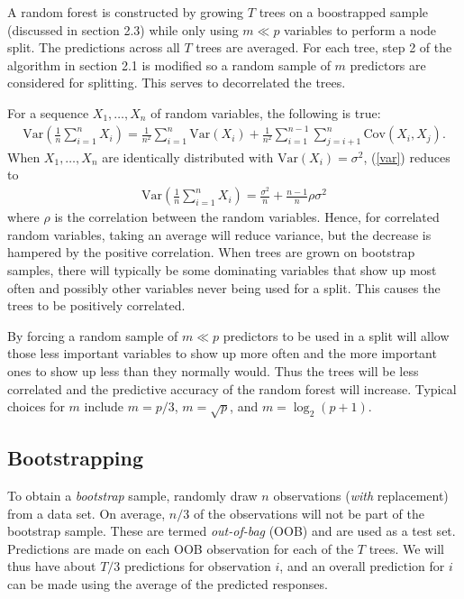 A random forest is constructed by growing $T$ trees on a boostrapped sample (discussed in section 2.3) while only using $m\ll p$ variables to perform a node split. The predictions across all $T$ trees are averaged. For each tree, step 2 of the algorithm in section 2.1 is modified so a random sample of $m$ predictors are considered for splitting. This serves to decorrelated the trees.

For a sequence $X_1,\ldots,X_n$ of random variables, the following is true:
\begin{eqnarray}
\mathrm{Var}\left(\frac{1}{n}\sum_{i=1}^nX_i\right) = \frac{1}{n^2}\sum_{i=1}^n\mathrm{Var}(X_i) + \frac{1}{n^2}\sum_{i=1}^{n-1}\sum_{j=i+1}^n\mathrm{Cov}(X_i,X_j).
\label{var}
\end{eqnarray}
When $X_1,\ldots,X_n$ are identically distributed with $\mathrm{Var}(X_i)=\sigma^2$, (\ref{var}) reduces to
\begin{eqnarray}
\mathrm{Var}\left(\frac{1}{n}\sum_{i=1}^nX_i\right) = \frac{\sigma^2}{n} + \frac{n-1}{n}\rho\sigma^2
\end{eqnarray}
where $\rho$ is the correlation between the random variables. Hence, for correlated random variables, taking an average will reduce variance, but the decrease is hampered by the positive correlation. When trees are grown on bootstrap samples, there will typically be some dominating variables that show up most often and possibly other variables never being used for a split. This causes the trees to be positively correlated.

By forcing a random sample of $m\ll p$ predictors to be used in a split will allow those less important variables to show up more often and the more important ones to show up less than they normally would. Thus the trees will be less correlated and the predictive accuracy of the random forest will increase. Typical choices for $m$ include $m=p/3$, $m=\sqrt{p}$, and $m=\log_2(p + 1)$.

\subsection{Bootstrapping}

To obtain a \emph{bootstrap} sample, randomly draw $n$ observations (\emph{with} replacement) from a data set. On average, $n/3$ of the observations will not be part of the bootstrap sample. These are termed \emph{out-of-bag} (OOB) and are used as a test set. Predictions are made on each OOB observation for each of the $T$ trees. We will thus have about $T/3$ predictions for observation $i$, and an overall prediction for $i$ can be made using the average of the predicted responses.

